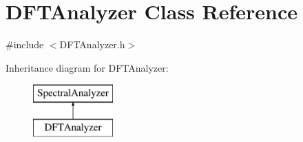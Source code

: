 \hypertarget{class_d_f_t_analyzer}{\section{D\+F\+T\+Analyzer Class Reference}
\label{class_d_f_t_analyzer}
}


{\ttfamily \#include $<$D\+F\+T\+Analyzer.\+h$>$}

Inheritance diagram for D\+F\+T\+Analyzer\+:\begin{figure}[H]
\begin{center}
\leavevmode
\includegraphics[height=2.000000cm]{class_d_f_t_analyzer}
\end{center}
\end{figure}
